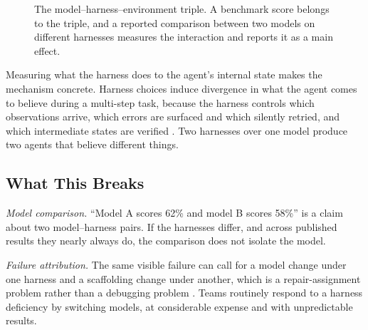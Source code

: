 \documentclass[11pt]{book}
\begin{document}
\begin{figure}[htbp]
\centering
{}
\caption{The model--harness--environment triple. A benchmark score belongs to the triple, and a reported comparison between two models on different harnesses measures the interaction and reports it as a main effect.}
\label{fig:harness-triple}
\end{figure}

Measuring what the harness does to the agent's internal state makes the mechanism concrete. Harness choices induce divergence in what the agent comes to believe during a multi-step task, because the harness controls which observations arrive, which errors are surfaced and which silently retried, and which intermediate states are verified \cite{harnessdiverge2026}. Two harnesses over one model produce two agents that believe different things.

\subsection{What This Breaks}

\textit{Model comparison.} ``Model A scores 62\% and model B scores 58\%'' is a claim about two model--harness pairs. If the harnesses differ, and across published results they nearly always do, the comparison does not isolate the model.

\textit{Failure attribution.} The same visible failure can call for a model change under one harness and a scaffolding change under another, which is a repair-assignment problem rather than a debugging problem \cite{modelharness2026}. Teams routinely respond to a harness deficiency by switching models, at considerable expense and with unpredictable results.
\end{document}
